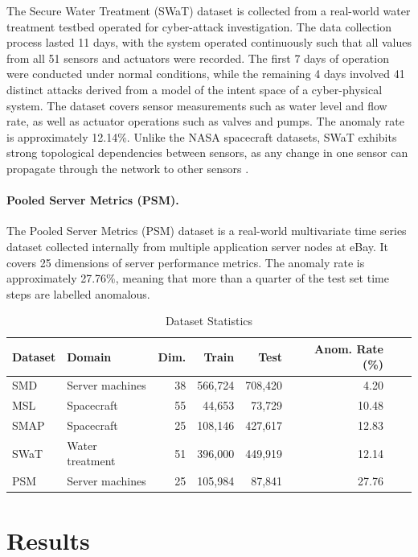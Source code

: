\documentclass[twoside,11pt,openright]{report}
\begin{document}
The Secure Water Treatment (SWaT) dataset \cite{mathur2016swat} is collected from a
real-world water treatment testbed operated for cyber-attack investigation. The data
collection process lasted 11 days, with the system operated continuously such that
all values from all 51 sensors and actuators were recorded. The first
7 days of operation were conducted under normal conditions, while the remaining 4
days involved 41 distinct attacks derived from a model of the intent space of a
cyber-physical system. The dataset covers sensor
measurements such as water level and flow rate, as well as actuator operations such
as valves and pumps. The anomaly rate is approximately 12.14\%. 
Unlike the NASA spacecraft datasets, SWaT exhibits strong
topological dependencies between sensors, as any change in one sensor can propagate
through the network to other sensors \cite{gta2022}.

\paragraph{Pooled Server Metrics (PSM).}

The Pooled Server Metrics (PSM) dataset \cite{abdulaal2021psm} is a real-world
multivariate time series dataset collected internally from multiple application
server nodes at eBay. It covers 25 dimensions of
server performance metrics. The anomaly rate is
approximately 27.76\%, meaning that more than a quarter
of the test set time steps are labelled anomalous.

\begin{table}[ht]
\centering
\caption{Dataset Statistics}
\label{tab:dataset_stats}
\begin{tabular}{llrrrrrr}
\toprule
\textbf{Dataset} & \textbf{Domain} & \textbf{Dim.} 
    & \textbf{Train} & \textbf{Test} & \textbf{Anom. Rate (\%)} \\
\midrule
SMD  & Server machines  & 38 & 566,724 & 708,420 & 4.20 \\
MSL  & Spacecraft       & 55 &  44,653 &  73,729 & 10.48 \\
SMAP & Spacecraft       & 25 & 108,146 & 427,617 & 12.83 \\
SWaT & Water treatment  & 51 & 396,000 & 449,919 & 12.14 \\
PSM  & Server machines  & 25 & 105,984 &  87,841 & 27.76 \\
\bottomrule
\end{tabular}
\end{table}

\section{Results}
\end{document}
